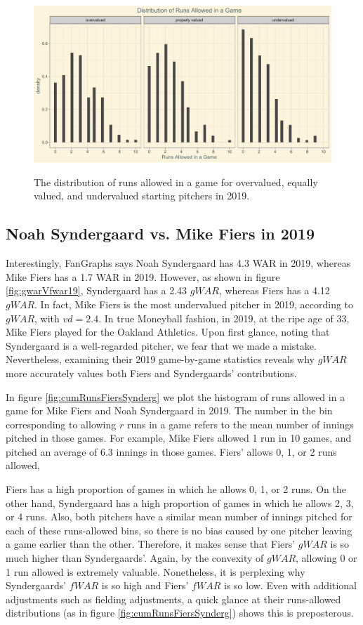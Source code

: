 \documentclass[12pt]{article}
\begin{document}
\begin{figure}[t!]
\centering
\caption{The distribution of runs allowed in a game for overvalued, equally valued, and undervalued starting pitchers in 2019.} 
\includegraphics[width=15cm]{../writeup_plots/plot_cumRuns_aggregated_2019.png}
\label{fig:cumRunsAggregated19}
\end{figure}



\subsection{Noah Syndergaard vs. Mike Fiers in 2019}

Interestingly, FanGraphs says Noah Syndergaard has 4.3 WAR in 2019, whereas Mike Fiers has a 1.7 WAR in 2019. However, as shown in figure \ref{fig:gwarVfwar19}, Syndergaard has a 2.43 $gWAR$, whereas Fiers has a 4.12 $gWAR$. In fact, Mike Fiers is the most undervalued pitcher in 2019, according to $gWAR$, with $vd = 2.4$. In true Moneyball fashion, in 2019, at the ripe age of 33, Mike Fiers played for the Oakland Athletics. Upon first glance, noting that Syndergaard is a well-regarded pitcher, we fear that we made a mistake. Nevertheless, examining their 2019 game-by-game statistics reveals why $gWAR$ more accurately values both Fiers and Syndergaards' contributions.

In figure \ref{fig:cumRunsFiersSynderg} we plot the histogram of runs allowed in a game for Mike Fiers and Noah Syndergaard in 2019. The number in the bin corresponding to allowing $r$ runs in a game refers to the mean number of innings pitched in those games. For example, Mike Fiers allowed 1 run in 10 games, and pitched an average of 6.3 innings in those games. Fiers' allows 0, 1, or 2 runs allowed, 

Fiers has a high proportion of games in which he allows 0, 1, or 2 runs. On the other hand, Syndergaard has a high proportion of games in which he allows 2, 3, or 4 runs. Also, both pitchers have a similar mean number of innings pitched for each of these runs-allowed bins, so there is no bias caused by one pitcher leaving a game earlier than the other. Therefore, it makes sense that Fiers' $gWAR$ is so much higher than Syndergaards'. Again, by the convexity of $gWAR$, allowing 0 or 1 run allowed is extremely valuable. Nonetheless, it is perplexing why Syndergaards' $fWAR$ is so high and Fiers' $fWAR$ is so low. Even with additional adjustments such as fielding adjustments, a quick glance at their runs-allowed distributions (as in figure \ref{fig:cumRunsFiersSynderg}) shows this is preposterous.  
\end{document}

